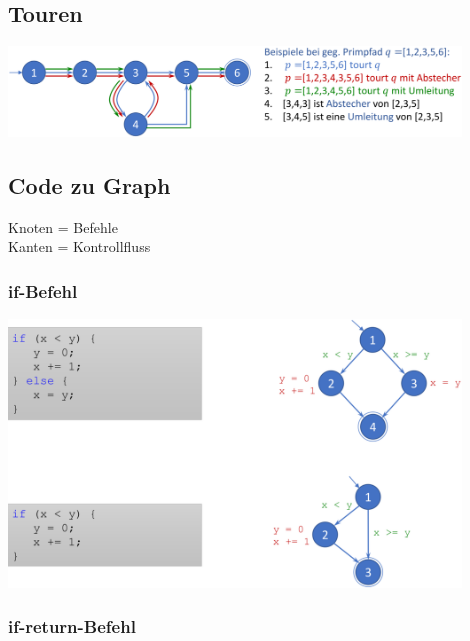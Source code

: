 \documentclass[11pt, a4paper]{article}
\begin{document}
\subsection{Touren}

\vspace{1em}

\centering \includegraphics[width=0.9\textwidth]{Graphen-07.png} 

\raggedright

\newpage

\subsection{Code zu Graph}

\vspace{1em}

Knoten = {\color{BrickRed}Befehle}\\
Kanten = {\color{ForestGreen}Kontrollfluss}

\vspace{1em}

\subsubsection{if-Befehl}

\centering \includegraphics[width=0.9\textwidth]{Graphen-08.png} 

\raggedright

\subsubsection{if-return-Befehl}
\end{document}
